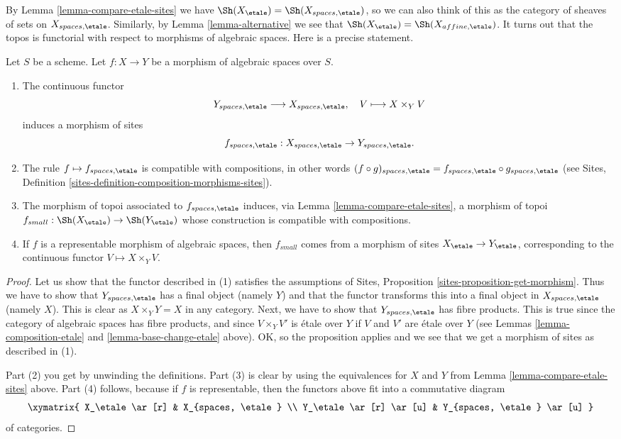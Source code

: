 \noindent
By
Lemma \ref{lemma-compare-etale-sites}
we have
$\Sh(X_\etale) = \Sh(X_{spaces, \etale})$,
so we can also think of this as the category of sheaves of sets on
$X_{spaces, \etale}$. Similarly, by
Lemma \ref{lemma-alternative}
we see that
$\Sh(X_\etale) = \Sh(X_{affine, \etale})$.
It turns out that the topos is functorial with respect to morphisms
of algebraic spaces. Here is a precise statement.

\begin{lemma}
\label{lemma-functoriality-etale-site}
Let $S$ be a scheme.
Let $f : X \to Y$ be a morphism of algebraic spaces over $S$.
\begin{enumerate}
\item The continuous functor
$$
Y_{spaces, \etale} \longrightarrow X_{spaces, \etale}, \quad
V \longmapsto X \times_Y V
$$
induces a morphism of sites
$$
f_{spaces, \etale} :
X_{spaces, \etale}
\to
Y_{spaces, \etale}.
$$
\item The rule $f \mapsto f_{spaces, \etale}$ is compatible with
compositions, in other words $(f \circ g)_{spaces, \etale}
= f_{spaces, \etale} \circ g_{spaces, \etale}$ (see
Sites, Definition \ref{sites-definition-composition-morphisms-sites}).
\item The morphism of topoi associated to $f_{spaces, \etale}$
induces, via Lemma \ref{lemma-compare-etale-sites}, a morphism of topoi
$f_{small} : \Sh(X_\etale) \to \Sh(Y_\etale)$
whose construction is compatible with compositions.
\item If $f$ is a representable morphism of algebraic spaces,
then $f_{small}$ comes from a morphism of sites
$X_\etale \to Y_\etale$,
corresponding to the continuous functor $V \mapsto X \times_Y V$.
\end{enumerate}
\end{lemma}

\begin{proof}
Let us show that the functor described in (1) satisfies the assumptions
of Sites, Proposition \ref{sites-proposition-get-morphism}.
Thus we have to show that
$Y_{spaces, \etale}$ has a final object (namely $Y$) and that
the functor transforms this into a final object in $X_{spaces, \etale}$
(namely $X$). This is clear as $X \times_Y Y = X$ in any category.
Next, we have to show that $Y_{spaces, \etale}$ has fibre products.
This is true since the category of algebraic spaces has fibre products,
and since $V \times_Y V'$ is \'etale over $Y$ if $V$ and $V'$ are \'etale
over $Y$ (see Lemmas \ref{lemma-composition-etale} and
\ref{lemma-base-change-etale} above).
OK, so the proposition applies and we see that we get a morphism
of sites as described in (1).

\medskip\noindent
Part (2) you get by unwinding the definitions.
Part (3) is clear by using the equivalences for $X$ and $Y$
from Lemma \ref{lemma-compare-etale-sites} above.
Part (4) follows, because if $f$ is representable, then the
functors above fit into a commutative diagram
$$
\xymatrix{
X_\etale \ar[r] &
X_{spaces, \etale} \\
Y_\etale \ar[r] \ar[u] &
Y_{spaces, \etale} \ar[u]
}
$$
of categories.
\end{proof}

